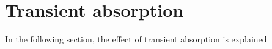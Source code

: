 \section{Transient absorption}
\label{sec:TheoTransAbs}

In the following section, the effect of transient absorption is explained
